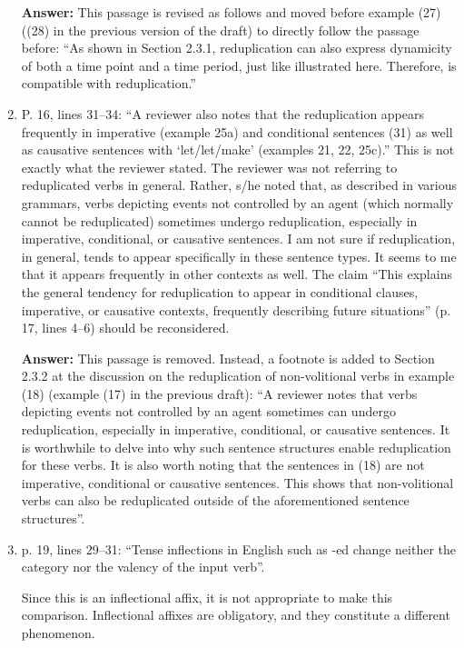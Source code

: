 \documentclass[fleqn,twoside]{article}
\begin{document}
\begin{enumerate}
\noindent
\textbf{Answer:} This passage is revised as follows 
and moved before example (27) ((28) in the previous version of the draft) to directly follow the passage before: 
``As shown in Section 2.3.1, reduplication can also express
 dynamicity of both a time point and a time period, 
 just like  illustrated here. 
 Therefore,  is compatible with reduplication.''


\item P. 16, lines 31--34: ``A reviewer also notes that the reduplication appears frequently in imperative
(example 25a) and conditional sentences (31) as well as causative sentences with 
`let/let/make' (examples 21, 22, 25c).''
This is not exactly what the reviewer stated. The reviewer was not referring to reduplicated verbs in
general. Rather, s/he noted that, as described in various grammars, verbs depicting events not
controlled by an agent (which normally cannot be reduplicated) sometimes undergo reduplication,
especially in imperative, conditional, or causative sentences. I am not sure if reduplication, in general,
tends to appear specifically in these sentence types. It seems to me that it appears frequently in other
contexts as well. The claim ``This explains the general tendency for reduplication to appear in
conditional clauses, imperative, or causative contexts, frequently describing future situations'' (p. 17,
lines 4--6) should be reconsidered.

\noindent
\textbf{Answer:} This passage is removed. 
Instead, a footnote is added to Section 2.3.2 at the discussion on 
the reduplication of non-volitional verbs in example (18) (example (17) in the previous draft): 
``A reviewer notes that verbs depicting events not controlled 
by an agent sometimes can undergo reduplication, 
especially in imperative, conditional, or causative sentences. 
It is worthwhile to delve into why such sentence structures
 enable reduplication for these verbs. 
 It is also worth noting that the sentences in (18) 
 are not imperative, conditional or causative sentences. 
 This shows that non-volitional verbs can also be reduplicated
  outside of the aforementioned sentence structures''.

\item p. 19, lines 29--31: ``Tense inflections in English such as -ed change neither the category nor the
valency of the input verb''.

Since this is an inflectional affix, it is not appropriate to make this comparison. Inflectional affixes
are obligatory, and they constitute a different phenomenon.


\end{enumerate}
\end{document}
